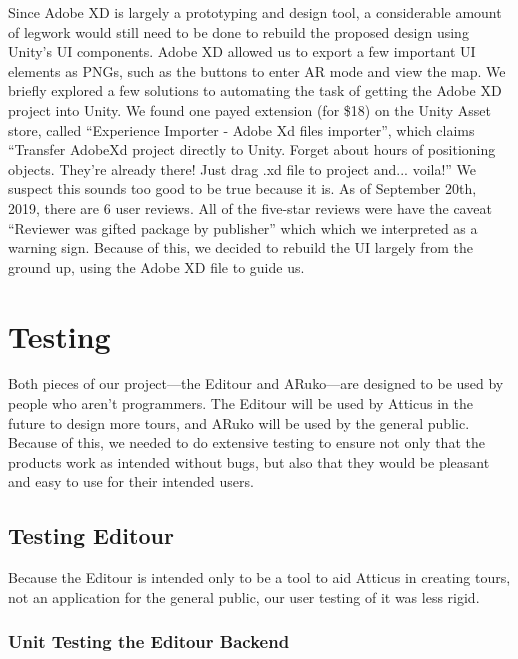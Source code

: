 \documentclass[a4paper, 10pt, american, titlepage]{article}
\begin{document}
Since Adobe XD is largely a prototyping and design tool, a considerable amount
of legwork would still need to be done to rebuild the proposed design using
Unity's UI components. Adobe XD allowed us to export a few important UI
elements as PNGs, such as the buttons to enter AR mode and view the map. We
briefly explored a few solutions to automating the task of getting the Adobe XD
project into Unity. We found one payed extension (for \$18) on the Unity Asset
store, called ``Experience Importer - Adobe Xd files importer'', which claims
``Transfer AdobeXd project directly to Unity. Forget about hours of positioning
objects. They're already there! Just drag .xd file to project and... voila!''
We suspect this sounds too good to be true because it is. As of September 20th,
2019, there are 6 user reviews. All of the five-star reviews were have the
caveat ``Reviewer was gifted package by publisher'' which which we interpreted
as a warning sign. Because of this, we decided to rebuild the UI largely from
the ground up, using the Adobe XD file to guide us.

\newpage

\section{Testing}
\label{sec:testing}

Both pieces of our project---the Editour and ARuko---are designed to be used by
people who aren't programmers. The Editour will be used by Atticus in the future
to design more tours, and ARuko will be used by the general public. Because of
this, we needed to do extensive testing to ensure not only that the products
work as intended without bugs, but also that they would be pleasant and easy to
use for their intended users.

\subsection{Testing Editour}
\label{sec:testingEditour}

Because the Editour is intended only to be a tool to aid Atticus in creating
tours, not an application for the general public, our user testing of it was less
rigid.

\subsubsection{Unit Testing the Editour Backend}
\label{sec:unitTestingTheEditourBackend}
\end{document}
